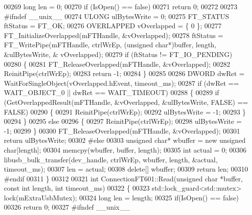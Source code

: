 \begin{DoxyCode}
{{{00269     \textcolor{keywordtype}{long} len = 0;
00270     \textcolor{keywordflow}{if} (IsOpen() == \textcolor{keyword}{false})
00271         \textcolor{keywordflow}{return} 0;
00272 
00273 \textcolor{preprocessor}{#ifndef \_\_unix\_\_}
00274     ULONG ulBytesWrite = 0;
00275     FT_STATUS ftStatus = FT_OK;
00276     OVERLAPPED  vOverlapped = \{ 0 \};
00277     FT\_InitializeOverlapped(mFTHandle, &vOverlapped);
00278     ftStatus = FT\_WritePipe(mFTHandle, ctrlWrEp, (\textcolor{keywordtype}{unsigned} \textcolor{keywordtype}{char}*)buffer, length, &ulBytesWrite, &
      vOverlapped);
00279     \textcolor{keywordflow}{if} (ftStatus != FT_IO_PENDING)
00280     \{
00281         FT\_ReleaseOverlapped(mFTHandle, &vOverlapped);
00282         ReinitPipe(ctrlWrEp);
00283         \textcolor{keywordflow}{return} -1;
00284     \}
00285 
00286     DWORD dwRet = WaitForSingleObject(vOverlapped.hEvent, timeout\_ms);
00287     \textcolor{keywordflow}{if} (dwRet == WAIT\_OBJECT\_0 || dwRet == WAIT\_TIMEOUT)
00288     \{
00289         \textcolor{keywordflow}{if} (GetOverlappedResult(mFTHandle, &vOverlapped, &ulBytesWrite, FALSE) == FALSE)
00290         \{
00291             ReinitPipe(ctrlWrEp);
00292             ulBytesWrite = -1;
00293         \}
00294     \}
00295     \textcolor{keywordflow}{else}
00296     \{
00297         ReinitPipe(ctrlWrEp);
00298         ulBytesWrite = -1;
00299     \}
00300     FT\_ReleaseOverlapped(mFTHandle, &vOverlapped);
00301     \textcolor{keywordflow}{return} ulBytesWrite;
00302 \textcolor{preprocessor}{#else}
00303     \textcolor{keywordtype}{unsigned} \textcolor{keywordtype}{char}* wbuffer = \textcolor{keyword}{new} \textcolor{keywordtype}{unsigned} \textcolor{keywordtype}{char}[length];
00304     memcpy(wbuffer, buffer, length);
00305     \textcolor{keywordtype}{int} actual = 0;
00306     libusb\_bulk\_transfer(dev\_handle, ctrlWrEp, wbuffer, length, &actual, timeout\_ms);
00307     len = actual;
00308     \textcolor{keyword}{delete}[] wbuffer;
00309     \textcolor{keywordflow}{return} len;
00310 \textcolor{preprocessor}{#endif}
00311 \}
00312 
00321 \textcolor{keywordtype}{int} ConnectionFT601::Read(\textcolor{keywordtype}{unsigned} \textcolor{keywordtype}{char} *buffer, \textcolor{keyword}{const} \textcolor{keywordtype}{int} length, \textcolor{keywordtype}{int} 
      timeout_ms)
00322 \{
00323     std::lock\_guard<std::mutex> lock(mExtraUsbMutex);
00324     \textcolor{keywordtype}{long} len = length;
00325     \textcolor{keywordflow}{if}(IsOpen() == \textcolor{keyword}{false})
00326         \textcolor{keywordflow}{return} 0;
00327 \textcolor{preprocessor}{#ifndef \_\_unix\_\_}
}}}
\end{DoxyCode}
